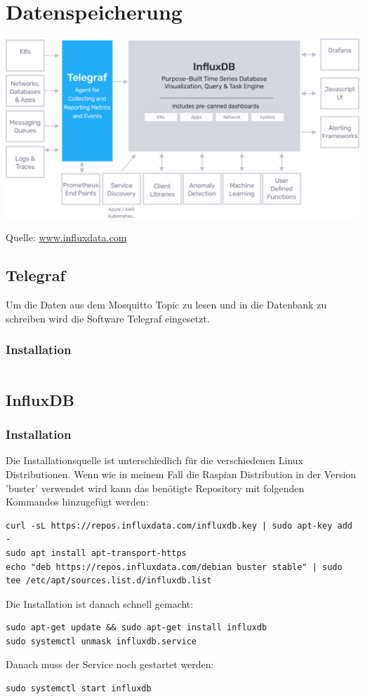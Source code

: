 \documentclass[
  12pt, %
  a4paper, %
  twoside, %
  openany, %
  numbers=noenddot, %
  BCOR=5mm, %
  parskip=half*, %
  thesis, %
]{bfhbook}
\newcommand{\source}[1]{\caption*{Quelle: {#1}} }
\begin{document}
\section{Datenspeicherung}
  \begin{center}
    \includegraphics[width=\textwidth]{Bilder/InfluxDB-2.png}
    \captionsetup{justification=centering}
    \source{\url{www.influxdata.com}}
   \end{center}
   \subsection{Telegraf}
Um die Daten aus dem Mosquitto Topic zu lesen und in die Datenbank zu schreiben wird die Software Telegraf \cite{telegraf} eingesetzt.
\subsubsection{Installation}
\begin{verbatim}

\end{verbatim}
\subsection{InfluxDB}
   \subsubsection{Installation}
   Die Installationsquelle ist unterschiedlich für die verschiedenen Linux Distributionen. Wenn wie in meinem Fall die Raspian Distribution in der Version 'buster' verwendet wird kann das benötigte Repository mit folgenden Kommandos hinzugefügt werden:
 \begin{verbatim}
curl -sL https://repos.influxdata.com/influxdb.key | sudo apt-key add -
sudo apt install apt-transport-https
echo "deb https://repos.influxdata.com/debian buster stable" | sudo tee /etc/apt/sources.list.d/influxdb.list
\end{verbatim}
Die Installation ist danach schnell gemacht:
 \begin{verbatim}
sudo apt-get update && sudo apt-get install influxdb
sudo systemctl unmask influxdb.service
   \end{verbatim}
   Danach muss der Service noch gestartet werden:
    \begin{verbatim}
sudo systemctl start influxdb
   \end{verbatim}
\end{document}
